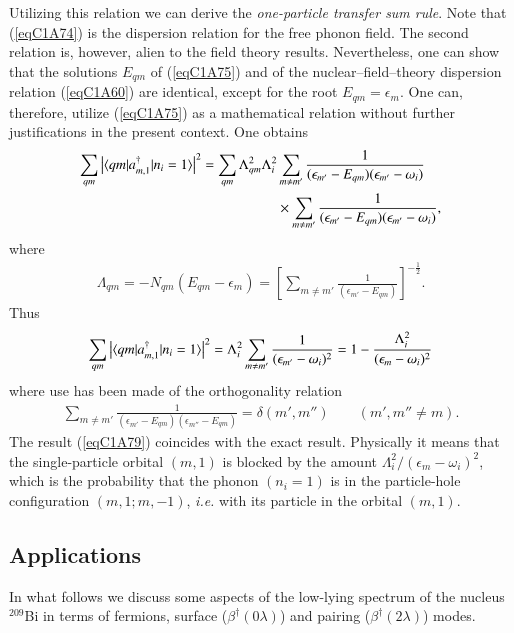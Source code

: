 Utilizing this relation we can derive the\textit{ one-particle transfer sum rule}. Note that (\ref{eqC1A74}) is the dispersion relation for the free phonon field. The second relation is, however, alien to the field theory results. Nevertheless, one can show that the solutions $E_{qm}$ of (\ref{eqC1A75}) and of the nuclear--field--theory dispersion relation (\ref{eqC1A60}) are identical, except for the root $E_{qm}=\epsilon_m$. One can, therefore, utilize (\ref{eqC1A75}) as a mathematical relation without further justifications in the 
present context. One obtains 
  \begin{align}\label{eqC1A77} 
   \nonumber \sum_{qm}\left|\langle {qm|a^\dagger_{m,1}|n_i=1} \rangle\right|^2=\sum_{qm}\Lambda_{qm}^2\Lambda_i^2& \sum_{m\neq m'}\frac{1}{(\epsilon_{m'}-E_{qm})(\epsilon_{m'}-\omega_i)}\\
   &\times \sum_{m\neq m'}\frac{1}{(\epsilon_{m'}-E_{qm})(\epsilon_{m'}-\omega_i)},
    \end{align} 
where
  \begin{align}\label{eqC1A78} 
   \Lambda_{qm}=-N_{qm}(E_{qm}-\epsilon_m)=\left[\sum_{m\neq m'}\frac{1}{(\epsilon_{m'}-E_{qm})}\right]^{-\frac{1}{2}}.
    \end{align} 
    Thus
      \begin{align}\label{eqC1A79} 
 \sum_{qm}\left|\langle {qm|a^\dagger_{m,1}|n_i=1} \rangle\right|^2=\Lambda_i^2\sum_{m\neq m'}\frac{1}{(\epsilon_{m'}-\omega_i)^2}=1-\frac{\Lambda^2_i}{(\epsilon_m-\omega_i)^2}     
        \end{align} 
where use has been made of the orthogonality relation 
  \begin{align}\label{eqC1A80} 
\sum_{m\neq m'}\frac{1}{(\epsilon_{m'}-E_{qm})(\epsilon_{m''}-E_{qm})}=\delta(m',m'')\qquad (m',m''\neq m).
    \end{align}  
The result (\ref{eqC1A79}) coincides with the exact result. Physically it means that the single-particle orbital $(m, 1)$ is blocked by the amount $\Lambda_i^2/(\epsilon_m-\omega_i)^2$, which is the probability that the phonon $(n_i= 1)$ is in the particle-hole configuration $(m,1;m,-1)$, \textit{i.e.} with its particle in the orbital $(m,1)$. 
\subsection{Applications}\label{Sect1.7.4}
In what follows we discuss some aspects of the low-lying spectrum of the nucleus $^{209}$Bi in terms of fermions, surface ($\beta^\dagger(0\lambda)$) and pairing ($\beta^\dagger(2\lambda)$) modes. 

